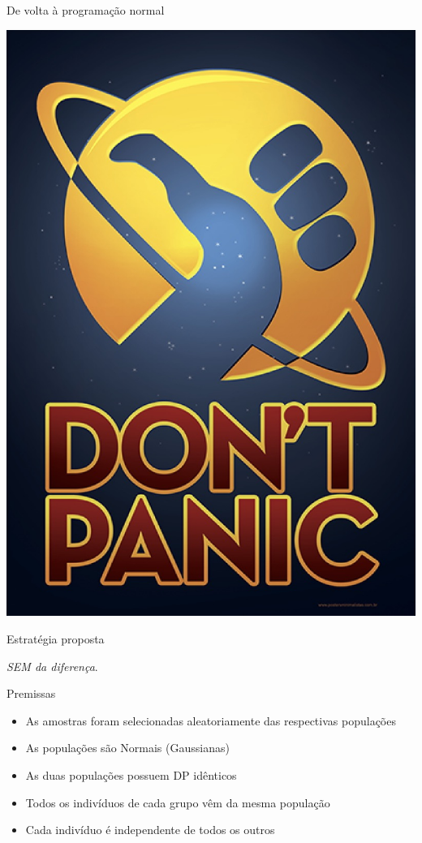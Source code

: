 \documentclass{beamer}
\begin{document}
\begin{frame}{De volta à programação normal}
  \begin{center}
    \includegraphics[height=.7\textheight]{Cap7/naoentreempanico}
  \end{center}
    \begin{block}{Estratégia proposta}
      \begin{center}
        {\em SEM da diferença}.
      \end{center}
  \end{block}
\end{frame}

\begin{frame}{Premissas}
  \begin{itemize}
  \item As amostras foram selecionadas aleatoriamente das respectivas populações
  \item As populações são Normais (Gaussianas)
  \item As duas populações possuem DP idênticos
  \item Todos os indivíduos de cada grupo vêm da mesma população
  \item Cada indivíduo é independente de todos os outros
  \end{itemize}
\end{frame}
\end{document}
